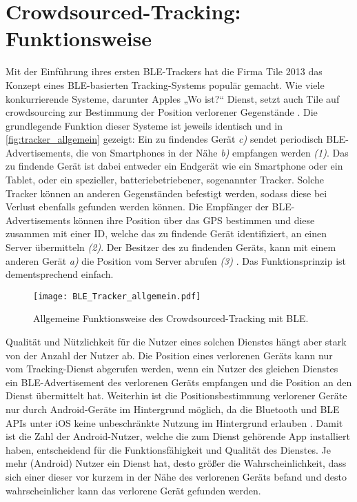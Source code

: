 \section{Crowdsourced-Tracking: Funktionsweise}
\label{sec:Funktionsweise}

Mit der Einführung ihres ersten \ac{BLE}-Trackers hat die Firma Tile 2013 das Konzept eines \ac{BLE}-basierten Tracking-Systems populär gemacht.
Wie viele konkurrierende Systeme, darunter Apples „Wo ist?“ Dienst, setzt auch Tile auf crowdsourcing zur Bestimmung der Position verlorener Gegenstände \cite{Weller_BLE_Finders}.
Die grundlegende Funktion dieser Systeme ist jeweils identisch und in \autoref{fig:tracker_allgemein} gezeigt: Ein zu findendes Gerät \textit{c)} sendet periodisch \ac{BLE}-Advertisements, die von Smartphones in der Nähe \textit{b)} empfangen werden \textit{(1)}.
Das zu findende Gerät ist dabei entweder ein Endgerät wie ein Smartphone oder ein Tablet, oder ein spezieller, batteriebetriebener, sogenannter Tracker.
Solche Tracker können an anderen Gegenständen befestigt werden, sodass diese bei Verlust ebenfalls gefunden werden können.
Die Empfänger der \ac{BLE}-Advertisements können ihre Position über das \ac{GPS} bestimmen und diese zusammen mit einer ID, welche das zu findende Gerät identifiziert, an einen Server übermitteln \textit{(2)}.
Der Besitzer des zu findenden Geräts, kann mit einem anderen Gerät \textit{a)} die Position vom Server abrufen \textit{(3)} \cite{Garg_Secure_Tracker}.
Das Funktionsprinzip ist dementsprechend einfach.
\begin{figure}[ht]
    \centering 
    \texttt{[image: BLE\_Tracker\_allgemein.pdf]}
    \caption{Allgemeine Funktionsweise des Crowdsourced-Tracking mit \ac{BLE}.}
    \label{fig:tracker_allgemein}
\end{figure}
Qualität und Nützlichkeit für die Nutzer eines solchen Dienstes hängt aber stark von der Anzahl der Nutzer ab.
Die Position eines verlorenen Geräts kann nur vom Tracking-Dienst abgerufen werden, wenn ein Nutzer des gleichen Dienstes ein \ac{BLE}-Advertisement des verlorenen Geräts empfangen und die Position an den Dienst übermittelt hat.
Weiterhin ist die Positionsbestimmung verlorener Geräte nur durch Android-Geräte im Hintergrund möglich, da die Bluetooth und \ac{BLE} \acp{API} unter iOS keine unbeschränkte Nutzung im Hintergrund erlauben \cite{Heinrich_AirGuard}.
Damit ist die Zahl der Android-Nutzer, welche die zum Dienst gehörende App installiert haben, entscheidend für die Funktionsfähigkeit und Qualität des Dienstes. 
Je mehr (Android) Nutzer ein Dienst hat, desto größer die Wahrscheinlichkeit, dass sich einer dieser vor kurzem in der Nähe des verlorenen Geräts befand und desto wahrscheinlicher kann das verlorene Gerät gefunden werden.


